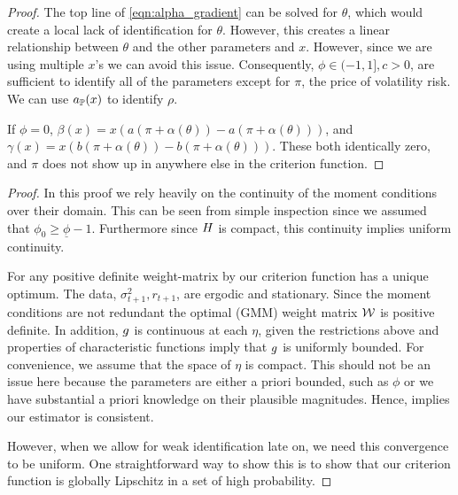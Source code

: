 \documentclass[11pt, letterpaper, twoside, final]{article}
\begin{document}
\begin{appendices}
\begin{proof}
    The top line of \cref{eqn:alpha_gradient} can be solved for $\theta$, which would create a local lack of
    identification for $\theta$.
    However, this creates a linear relationship between $\theta$ and the other parameters and $x$.
    However, since we are using multiple $x$'s we can avoid this issue.
    Consequently,  $\phi \in (-1,1], c > 0$, are sufficient to identify all of the parameters except for $\pi$,
    the price of volatility risk.
    We can use $a_{\mathbb{P}}(x)$ to identify $\rho$.
    
    If $\phi = 0$, $\beta(x) = x \left(a (\pi + \alpha(\theta)) - a(\pi + \alpha(\theta))\right)$, and
    $\gamma(x) =  x \left(b (\pi + \alpha(\theta)) - b(\pi + \alpha(\theta))\right)$.
    These both  identically zero, and $\pi$ does not show up in anywhere  else in the criterion function.
    
    \end{proof}


\UllnStrongID*

\begin{proof}

    In this proof we rely heavily on the continuity of the moment conditions over their domain. 
    This can be seen from simple inspection since we assumed that $\phi_0 \geq \underline{\phi} -1$.
    Furthermore since $H$ is compact, this continuity implies uniform continuity.
    
    For any positive definite weight-matrix by \textcite[Lemma 2.3]{newey1994large} our criterion function has
    a unique optimum.
    The data, $\sigma^2_{t+1}, r_{t+1}$, are ergodic and stationary.
    Since the moment conditions are not redundant the optimal (GMM) weight matrix $\mathcal{W}$ is positive definite. 
    In addition, $g$ is continuous at each $\eta$, given the restrictions above and properties of
    characteristic functions imply that $g$ is uniformly bounded. 
    For convenience, we assume that the space of $\eta$ is compact.
    This should not be an issue here because the parameters  are either a priori bounded, such as $\phi$ or we
    have substantial a priori knowledge on their plausible magnitudes.
    Hence, \textcite[Theroem 2.6]{newey1994large} implies our estimator is consistent.
    
    However, when we allow for weak identification late on, we need this convergence to be uniform. 
    One straightforward way to show this is to show that our criterion function is globally Lipschitz in a set of
    high probability. 
    

\end{proof}
\end{appendices}
\end{document}
